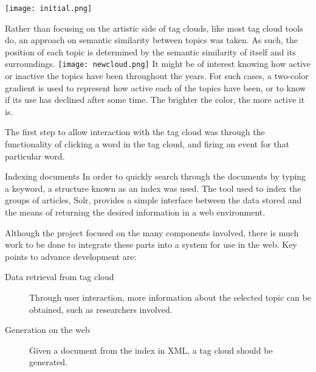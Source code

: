 \documentclass[a0paper, portrait]{baposter}
\begin{document}
\begin{poster}
{    \texttt{[image: initial.png]}
    \label{fig:2}

  }

   {
    Rather than focusing on the artistic side of tag clouds, like most tag cloud tools do, an approach on semantic similarity between topics was taken. As such, the position of each topic is determined by the semantic similarity of itself and its surroundings.
    \texttt{[image: newcloud.png]}
    \label{fig:3}
    It might be of interest knowing how active or inactive the topics have been throughout the years. For such cases, a two-color gradient is used to represent how active each of the topics have been, or to know if its use has declined after some time. The brighter the color, the more active it is. %
  }

   {
    The first step to allow interaction with the tag cloud was through the functionality of clicking a word in the tag cloud, and firing an event for that particular word. %
  }


  \begin{posterbox}[column=1, name=index, below=interact]{Indexing documents} {
    In order to quickly search through the documents by typing a keyword, a structure known as an index was used. The tool used to index the groups of articles, Solr, provides a simple interface between the data stored and the means of returning the desired information in a web environment. 
    }
  \end{posterbox}
  
   {
    Although the project focused on the many components involved, there is much work to be done to integrate these parts into a system for use in the web. Key points to advance development are:
    \begin{description}
      \item[Data retrieval from tag cloud] Through user interaction, more information about the selected topic can be obtained, such as researchers involved.
      \item[Generation on the web] Given a document from the index in XML, a tag cloud should be generated.
    \end{description}

}
\end{poster}
\end{document}
